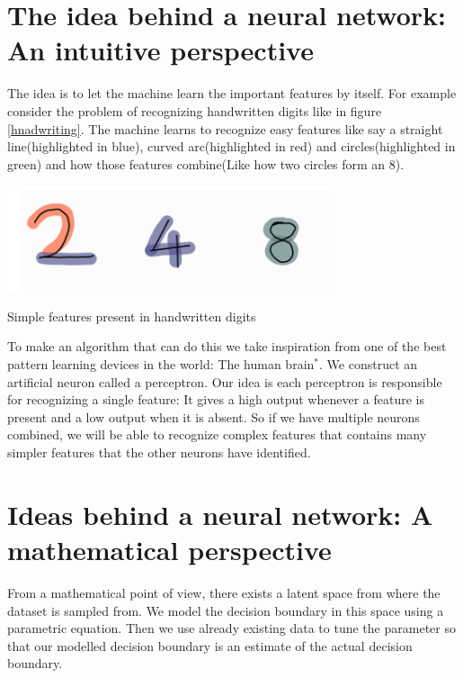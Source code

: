 \section{The idea behind a neural network: An intuitive perspective}
The idea is to let the machine learn the important features by itself. For example consider the
problem of recognizing handwritten digits like in figure \ref{hnadwriting}. The machine learns to recognize easy features like say a straight line(highlighted in blue), curved arc(highlighted in red) and
circles(highlighted in green) and how those features combine(Like how two circles form an 8).
\begin{marginfigure}
    \begin{center}
        \includegraphics[width=\textwidth]{graphics/handwriting.png}
        \caption{Simple features present in handwritten digits}\label{hnadwriting}
    \end{center}
    \end{marginfigure}
To make an algorithm that can do this we take inspiration from one of the best pattern
learning devices in the world: The human brain$^*$. We construct an artificial neuron called a
perceptron. Our idea is each perceptron is responsible for recognizing a single feature: It gives
a high output whenever a feature is present and a low output when it is absent. So if we have
multiple neurons combined, we will be able to recognize complex features that contains many
simpler features that the other neurons have identified.
\section{Ideas behind a neural network: A mathematical perspective}
From a mathematical point of view, there exists a latent space from where the dataset is sampled from. We model the decision boundary in this space using a parametric equation. Then we use already existing data to tune the parameter so that our modelled decision boundary is an estimate of the actual decision boundary.
